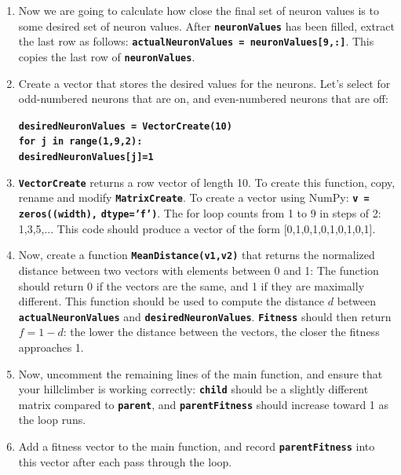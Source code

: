 \documentclass[12pt]{article}
\begin{document}
\begin{enumerate}
\item Now we are going to calculate how close the final set of neuron values is to some desired set of neuron values. After \textbf{\texttt{neuronValues}} has been filled, extract the last row as follows: \textbf{\texttt{actualNeuronValues = neuronValues[9,:]}}. This copies the last row of \textbf{\texttt{neuronValues}}.

\item Create a vector that stores the desired values for the neurons. Let's select for odd-numbered neurons that are on, and even-numbered neurons that are off:

\textbf{\texttt{desiredNeuronValues = VectorCreate(10)}}\\
\textbf{\texttt{for j in range(1,9,2):}}\\
\indent \textbf{\texttt{\hspace{1cm}desiredNeuronValues[j]=1}}\\

\item \textbf{\texttt{VectorCreate}} returns a row vector of length 10. To create this function, copy, rename and modify \textbf{\texttt{MatrixCreate}}. To create a vector using NumPy: \textbf{\texttt{v = zeros((width),}} \textbf{\texttt{dtype='f')}}. The for loop counts from 1 to 9 in steps of 2: 1,3,5,... This code should produce a vector of the form [0,1,0,1,0,1,0,1,0,1].

\item Now, create a function \textbf{\texttt{MeanDistance(v1,v2)}} that returns the normalized distance between two vectors with elements between 0 and 1: The function should return 0 if the vectors are the same, and 1 if they are maximally different. This function should be used to compute the distance $d$ between \textbf{\texttt{actualNeuronValues}} and \textbf{\texttt{desiredNeuronValues}}. \textbf{\texttt{Fitness}} should then return $f=1-d$: the lower the distance between the vectors, the closer the fitness approaches 1.

\item Now, uncomment the remaining lines of the main function, and ensure that your hillclimber is working correctly: \textbf{\texttt{child}} should be a slightly different matrix compared to \textbf{\texttt{parent}}, and \textbf{\texttt{parentFitness}} should increase toward 1 as the loop runs.

\item Add a fitness vector to the main function, and record \textbf{\texttt{parentFitness}} into this vector after each pass through the loop.


\end{enumerate}
\end{document}
